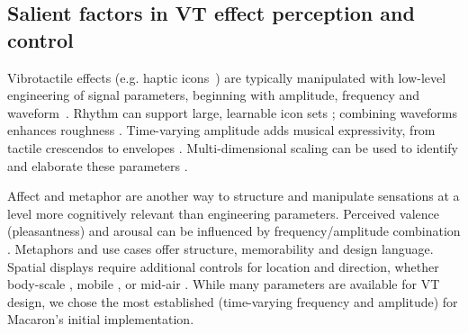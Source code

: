 \subsection{Salient factors in VT effect perception and control}
Vibrotactile effects (e.g. haptic icons~\cite{MacLean2003}) are typically manipulated with low-level engineering of signal parameters, beginning with  amplitude, frequency and waveform~\cite{Gunther2002,MacLean2003,Brewster2004,maclean2008foundations}.
%
Rhythm can support large, learnable icon sets \cite{Ternes2008,Swerdfeger2009a};  combining waveforms enhances roughness \cite{GunhyukPark2011}.
Time-varying amplitude adds musical expressivity, from tactile crescendos \cite{Brown2006} to 
envelopes \cite{Schneider2014}.
Multi-dimensional scaling %
can be used to identify %
and elaborate these parameters \cite{MacLean2003,VanErp2003,Enriquez2006,Hollins2000}.

Affect and metaphor are another way to structure and manipulate sensations at a level more cognitively relevant than engineering parameters.
Perceived valence (pleasantness) and arousal can be influenced by  frequency/amplitude combination \cite{YongjaeYoo2015,Obrist2015}.
Metaphors \cite{chan2008,Obrist2013,Seifi2015} and use cases \cite{chan2008,Seifi2015} offer structure, memorability and design language.
Spatial displays require additional controls for location and direction, %
whether body-scale \cite{Gunther2002,Israr2011a}, mobile  \cite{Seo2013}, or mid-air \cite{Obrist2015}.
While many parameters are available for VT design, we chose the most established (time-varying frequency and amplitude) for Macaron's initial implementation.

